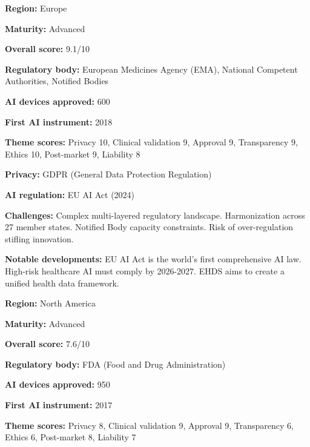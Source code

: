 \begingroup
\setlength{\parskip}{3pt}
\renewcommand{\arraystretch}{1.15}

\par
\vspace{0.15em}
\noindent\textbf{Region:} Europe\par
\noindent\textbf{Maturity:} Advanced\par
\noindent\textbf{Overall score:} 9.1/10\par
\noindent\textbf{Regulatory body:} European Medicines Agency (EMA), National Competent Authorities, Notified Bodies\par
\noindent\textbf{AI devices approved:} 600\par
\noindent\textbf{First AI instrument:} 2018\par
\noindent\textbf{Theme scores:} Privacy 10, Clinical validation 9, Approval 9, Transparency 9, Ethics 10, Post-market 9, Liability 8\par
\noindent\textbf{Privacy:} GDPR (General Data Protection Regulation)\par
\noindent\textbf{AI regulation:} EU AI Act (2024)\par
\noindent\textbf{Challenges:} Complex multi-layered regulatory landscape. Harmonization across 27 member states. Notified Body capacity constraints. Risk of over-regulation stifling innovation.\par
\noindent\textbf{Notable developments:} EU AI Act is the world's first comprehensive AI law. High-risk healthcare AI must comply by 2026-2027. EHDS aims to create a unified health data framework.\par
\vspace{0.55em}
\par
\vspace{0.15em}
\noindent\textbf{Region:} North America\par
\noindent\textbf{Maturity:} Advanced\par
\noindent\textbf{Overall score:} 7.6/10\par
\noindent\textbf{Regulatory body:} FDA (Food and Drug Administration)\par
\noindent\textbf{AI devices approved:} 950\par
\noindent\textbf{First AI instrument:} 2017\par
\noindent\textbf{Theme scores:} Privacy 8, Clinical validation 9, Approval 9, Transparency 6, Ethics 6, Post-market 8, Liability 7\par
